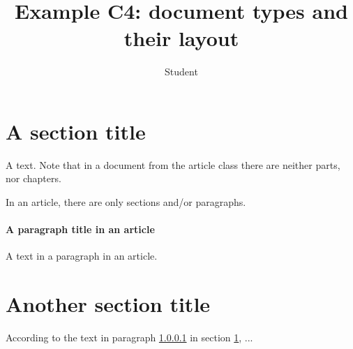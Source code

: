 \documentclass{article}
\title{Example C4: document types and their layout}
\author{Student}
\begin{document}
\maketitle
\tableofcontents
\section{A section title}\label{sec:et}
A text. Note that in a document from the article class there are neither parts, nor chapters.\par 
In an article, there are only sections and/or paragraphs.
\paragraph{A paragraph title in an article}\label{par:et}
A text in a paragraph in an article.  
\section{Another section title}
According to the text in paragraph \ref{par:et} in section \ref{sec:et}, ... 
\end{document}
